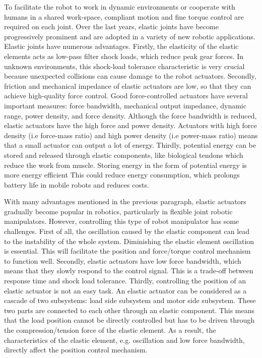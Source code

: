 \documentclass[./main.tex]{subfiles}
\begin{document}
To facilitate the robot to work in dynamic environments or cooperate with humans in a shared work-space, compliant motion and fine torque control are required on each joint. Over the last years, elastic joints have become progressively prominent and are adopted in a variety of new robotic applications. Elastic joints have numerous advantages. Firstly, the elasticity of the elastic elements acts as low-pass filter shock loads, which reduce peak gear forces. In unknown environments, this shock-load tolerance characteristic is very crucial because unexpected collisions can cause damage to the robot actuators. Secondly, friction and mechanical impedance of elastic actuators are low, so that they can achieve high-quality force control. Good force-controlled actuators have several important measures: force bandwidth, mechanical output impedance, dynamic range, power density, and force density. Although the force bandwidth is reduced, elastic actuators have the high force and power density. Actuators with high force density (i.e force-mass ratio) and high power density (i.e power-mass ratio) means that a small actuator can output a lot of energy. Thirdly, potential energy can be stored and released through elastic components, like biological tendons which reduce the work from muscle. Storing energy in the form of potential energy is more energy efficient This could reduce energy consumption, which prolongs battery life in mobile robots and reduces costs.

With many advantages mentioned in the previous paragraph, elastic actuators gradually become popular in robotics, particularly in flexible joint robotic manipulators. However, controlling this type of robot manipulator has some challenges. First of all, the oscillation caused by the elastic component can lead to the instability of the whole system. Diminishing the elastic element oscillation is essential. This will facilitate the position and force/torque control mechanism to function well. Secondly, elastic actuators have low force bandwidth, which means that they slowly respond to the control signal. This is a trade-off between response time and shock load tolerance. Thirdly, controlling the position of an elastic actuator is not an easy task. An elastic actuator can be considered as a cascade of two subsystems: load side subsystem and motor side subsystem. These two parts are connected to each other through an elastic component. This means that the load position cannot be directly controlled but has to be driven through the compression/tension force of the elastic element. As a result, the characteristics of the elastic element, e.g. oscillation and low force bandwidth, directly affect the position control mechanism.
\end{document}
